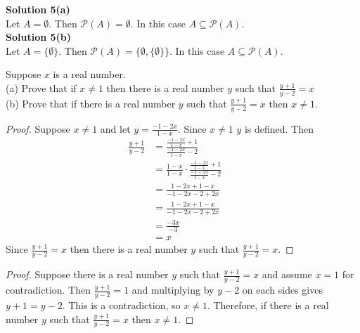 \textbf{Solution 5(a)} \\
Let $A = \emptyset$. Then $\mathcal{P}(A) = \emptyset$. In this case $A \subseteq \mathcal{P}(A)$. \\
\textbf{Solution 5(b)} \\
Let $A = \{\emptyset\}$. Then $\mathcal{P}(A) = \{\emptyset, \{\emptyset\}\}$. In this case $A \subseteq \mathcal{P}(A)$.

\begin{tcolorbox}[title=Problem 6, breakable]
    Suppose $x$ is a real number. \\
    (a) Prove that if $x \not =  1$ then there is a real number $y$
    such that $\frac{y + 1}{y - 2} = x$ \\
    (b) Prove that if there is a real number $y$ such that $\frac{y + 1}{y - 2} = x$
    then $x \not =  1$.
\end{tcolorbox}

\begin{proof}
    Suppose $x \not = 1$ and let $y = \frac{-1 - 2x}{1 - x}$. Since $x \not = 1$
    $y$ is defined. Then 
    \begin{align*}
        \frac{y + 1}{y - 2}
         & = \frac{\frac{-1 - 2x}{1 - x} + 1}{\frac{-1 - 2x}{1 - x} - 2}                           &  & \\
         & = \frac{1 - x}{1 - x} \cdot \frac{\frac{-1 - 2x}{1 - x} + 1}{\frac{-1 - 2x}{1 - x} - 2} &  & \\
         & = \frac{1 - 2x + 1 - x}{-1 - 2x - 2 + 2x}                                               &  & \\
         & = \frac{1 - 2x + 1 - x}{-1 - 2x - 2 + 2x}                                               &  & \\
         & = \frac{-3x}{-3}                                                                        &  & \\
         & = x
    \end{align*}
    Since $\frac{y + 1}{y - 2} = x$ then there is a real number $y$
    such that $\frac{y + 1}{y - 2} = x$.
\end{proof}

\begin{proof}
    Suppose there is a real number $y$ such that $\frac{y + 1}{y - 2} = x$ and assume 
    $x = 1$ for contradiction. Then $\frac{y + 1}{y - 2} = 1$ and multiplying 
    by $y - 2$ on each sides gives $y + 1 = y - 2$. This is a contradiction, so 
    $x \not = 1$. Therefore, if there is a real number $y$ such that $\frac{y + 1}{y - 2} = x$
    then $x \not =  1$.
\end{proof}

